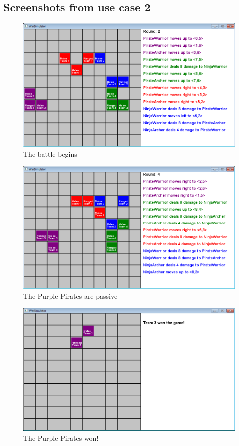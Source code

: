 	\subsection*{Screenshots from use case 2}
		\begin{figure}[H]
			\center
			\includegraphics[scale=0.6]{rapport/7/figures/case2-1.png}
			\caption{The battle begins}
		\label{pic:case21}
		\end{figure}
		\begin{figure}[H]
		\center
			\includegraphics[scale=0.6]{rapport/7/figures/case2-2.png}
			\caption{The Purple Pirates are passive}
		\label{pic:case22}
		\end{figure}
		\begin{figure}[H]

		\center
			\includegraphics[scale=0.6]{rapport/7/figures/case2-3.png}
			\caption{The Purple Pirates won!}
			\label{pic:case23}
		\end{figure}
	
